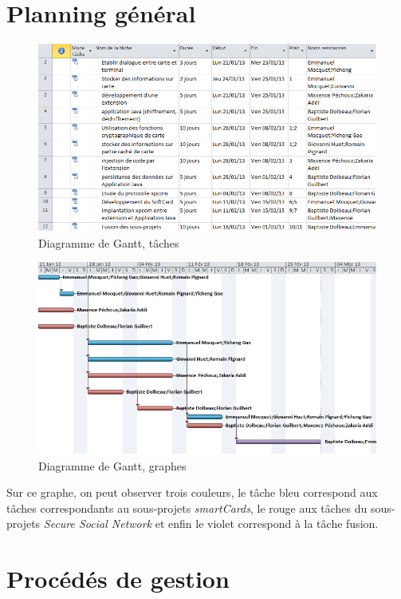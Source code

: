 \documentclass[a4paper,11pt,french]{article}
\begin{document}
\section{Planning général}
\begin{center}
\begin{figure}[!h]
\includegraphics[scale=0.75]{ganttArray.png}
\caption{Diagramme de Gantt, tâches}
\end{figure}
\begin{figure}[!h]
\includegraphics[scale=0.75]{ganttDiag.png}
\caption{Diagramme de Gantt, graphes}
\end{figure}
\end{center}
Sur ce graphe, on peut observer trois couleurs, le tâche bleu correspond
aux tâches correspondants au sous-projets \emph{smartCards}, le rouge aux
tâches du sous-projets \emph{Secure Social Network} et enfin le violet
correspond à la tâche fusion.
\section{Procédés de gestion}
\end{document}
